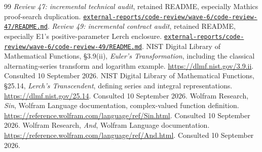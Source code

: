 \documentclass[11pt,a4paper]{article}
\newcommand{\reposource}[1]{\href{https://github.com/VladimirReshetnikov/Asymptotic/blob/efa1aeec4845a9c35e140963a0333d0c9ec33b05/#1}{\nolinkurl{#1}}}
\begin{document}
\begin{thebibliography}{99}
 \emph{Review 47: incremental technical audit}, retained README, especially Mathics proof-search duplication. \reposource{external-reports/code-review/wave-6/code-review-47/README.md}.
 \emph{Review 49: incremental contract audit}, retained README, especially E1's positive-parameter Lerch enclosure. \reposource{external-reports/code-review/wave-6/code-review-49/README.md}.
 NIST Digital Library of Mathematical Functions, \S3.9(ii), \emph{Euler's Transformation}, including the classical alternating-series transform and logarithm example. \url{https://dlmf.nist.gov/3.9.ii}. Consulted 10 September 2026.
 NIST Digital Library of Mathematical Functions, \S25.14, \emph{Lerch's Transcendent}, defining series and integral representations. \url{https://dlmf.nist.gov/25.14}. Consulted 10 September 2026.
 Wolfram Research, \emph{Sin}, Wolfram Language documentation, complex-valued function definition. \url{https://reference.wolfram.com/language/ref/Sin.html}. Consulted 10 September 2026.
 Wolfram Research, \emph{And}, Wolfram Language documentation. \url{https://reference.wolfram.com/language/ref/And.html}. Consulted 10 September 2026.
\end{thebibliography}
\end{document}
